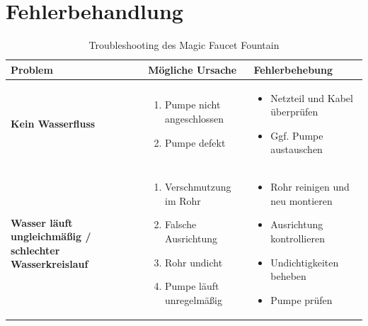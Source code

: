 %
%
%

\chapter{Fehlerbehandlung}
\begin{table}[h]
	\centering
	\caption{Troubleshooting des Magic Faucet Fountain}
	\renewcommand{\arraystretch}{1.4}
	\begin{tabular}{|>{\centering\arraybackslash}m{4.5cm}|
			>{\centering\arraybackslash}m{5.2cm}|
			>{\centering\arraybackslash}m{5cm}|}
		\hline
		\textbf{Problem} & \textbf{Mögliche Ursache} & \textbf{Fehlerbehebung} \\
		\hline
		\textbf{Kein Wasserfluss} 
		& \begin{enumerate}[nosep,leftmargin=*]
			\item Pumpe nicht angeschlossen
			\item Pumpe defekt
		\end{enumerate}
		& \begin{itemize}[nosep,leftmargin=*]
			\item Netzteil und Kabel überprüfen
			\item Ggf. Pumpe austauschen
		\end{itemize} \\
		\hline
		\textbf{Wasser läuft ungleichmäßig / schlechter Wasserkreislauf} 
		& \begin{enumerate}[nosep,leftmargin=*]
			\item Verschmutzung im Rohr
			\item Falsche Ausrichtung
			\item Rohr undicht
			\item Pumpe läuft unregelmäßig
		\end{enumerate}
		& \begin{itemize}[nosep,leftmargin=*]
			\item Rohr reinigen und neu montieren
			\item Ausrichtung kontrollieren
			\item Undichtigkeiten beheben
			\item Pumpe prüfen

\end{itemize}
\end{tabular}
\end{table}
